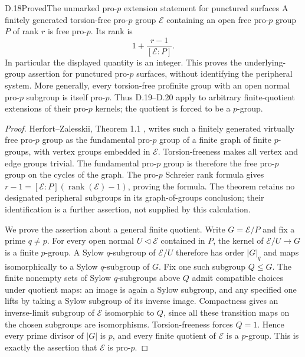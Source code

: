 \begin{claim}{D.18}{Proved}{The unmarked pro-$p$ extension statement for punctured surfaces}
A finitely generated torsion-free pro-$p$ group $\mathcal E$ containing an open free pro-$p$ group $P$ of rank $r$ is free pro-$p$. Its rank is
\[
 1+\frac{r-1}{[\mathcal E:P]}.
\]
In particular the displayed quantity is an integer. This proves the underlying-group assertion for punctured pro-$p$ surfaces, without identifying the peripheral system. More generally, every torsion-free profinite group with an open normal pro-$p$ subgroup is itself pro-$p$. Thus D.19--D.20 apply to arbitrary finite-quotient extensions of their pro-$p$ kernels; the quotient is forced to be a $p$-group.
\end{claim}
\begin{proof}
Herfort--Zalesskii, Theorem 1.1 \cite{R-HZ}, writes such a finitely generated virtually free pro-$p$ group as the fundamental pro-$p$ group of a finite graph of finite $p$-groups, with vertex groups embedded in $\mathcal E$. Torsion-freeness makes all vertex and edge groups trivial. The fundamental pro-$p$ group is therefore the free pro-$p$ group on the cycles of the graph. The pro-$p$ Schreier rank formula gives $r-1=[\mathcal E:P](\operatorname{rank}(\mathcal E)-1)$, proving the formula. The theorem retains no designated peripheral subgroups in its graph-of-groups conclusion; their identification is a further assertion, not supplied by this calculation.

We prove the assertion about a general finite quotient. Write $G=\mathcal E/P$ and fix a prime $q\ne p$. For every open normal $U\triangleleft\mathcal E$ contained in $P$, the kernel of $\mathcal E/U\to G$ is a finite $p$-group. A Sylow $q$-subgroup of $\mathcal E/U$ therefore has order $|G|_q$ and maps isomorphically to a Sylow $q$-subgroup of $G$. Fix one such subgroup $Q\leq G$. The finite nonempty sets of Sylow $q$-subgroups above $Q$ admit compatible choices under quotient maps: an image is again a Sylow subgroup, and any specified one lifts by taking a Sylow subgroup of its inverse image. Compactness gives an inverse-limit subgroup of $\mathcal E$ isomorphic to $Q$, since all these transition maps on the chosen subgroups are isomorphisms. Torsion-freeness forces $Q=1$. Hence every prime divisor of $|G|$ is $p$, and every finite quotient of $\mathcal E$ is a $p$-group. This is exactly the assertion that $\mathcal E$ is pro-$p$.
\end{proof}


